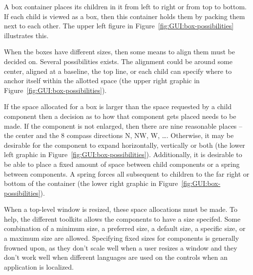 A box container places its children in it from left to right or from
top to bottom.  If each child is viewed as a box, then this container
holds them by packing them next to each other. The upper left figure in
Figure~\ref{fig:GUI:box-possibilities} illustrates this. 

When the boxes have different sizes, then some means to align them
must be decided on. Several possibilities exists. The alignment could
be around some center, aligned at a baseline, the top line, or each
child can specify where to anchor itself within the allotted space
(the upper right graphic in Figure~\ref{fig:GUI:box-possibilities}).

If the space allocated for a box is larger than the space requested by
a child component then a decision as to how that component gets placed
needs to be made. If the component is not enlarged, then there are
nine reasonable places -- the center and the 8 compass directions N,
NW, W, \dots. Otherwise, it may be desirable for the component to
expand horizontally, vertically or both (the lower left graphic in
Figure~\ref{fig:GUI:box-possibilities}). Additionally, it is desirable
to be able to place a fixed amount of space between child components
or a spring between components. A spring forces all subsequent to
children to the far right or bottom of the container (the lower right
graphic in Figure~\ref{fig:GUI:box-possibilities}).


When a top-level window is resized, these space allocations must be
made. To help, the different toolkits allows the components to have a
size specifed. Some combination of a minimum size, a preferred size, a
default size, a specific size, or a maximum size are
allowed. Specifying fixed sizes for components is generally frowned
upon, as they don't scale well when a user resizes a window and they
don't work well when different languages are used on the controls when
an application is localized.


